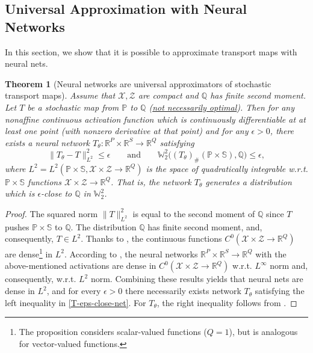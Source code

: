 \documentclass{article} %
\newtheorem{theorem}{Theorem}
\begin{document}
\vspace{-1mm}
\subsection{Universal Approximation with Neural Networks}
\label{sec-universal-approx}
\vspace{-1mm}

In this section, we show that it is possible to approximate transport maps with neural nets.

\begin{theorem}[Neural networks are universal approximators of stochastic transport maps] Assume that $\mathcal{X},\mathcal{Z}$ are compact and $\mathbb{Q}$ has finite second moment. Let $T$ be a stochastic map from $\mathbb{P}$ to $\mathbb{Q}$ (\underline{not necessarily optimal}). Then for any nonaffine continuous activation function which is continuously differentiable at at least one point (with nonzero derivative at that point) and for any $\epsilon>0$, there exists a neural network $T_{\theta}:\mathbb{R}^{P}\times\mathbb{R}^{S}\rightarrow\mathbb{R}^{Q}$ satisfying
\begin{equation}
\|T_{\theta}-T\|^{2}_{L^{2}}\leq \epsilon\qquad\text{and}\qquad \mathbb{W}_{2}^{2}\big((T_{\theta})_{\#}(\mathbb{P}\times\mathbb{S}),\mathbb{Q}\big)\leq \epsilon,
\label{T-eps-close-net}
\end{equation}
where $L^{2}=L^{2}(\mathbb{P}\times\mathbb{S},\mathcal{X}\times\mathcal{Z}\rightarrow\mathbb{R}^{Q})$ is the space of quadratically integrable w.r.t. $\mathbb{P}\times\mathbb{S}$ functions $\mathcal{X}\times\mathcal{Z}\rightarrow\mathbb{R}^{Q}$. That is, the network $T_{\theta}$ generates a distribution which is $\epsilon$-close to $\mathbb{Q}$ in $\mathbb{W}_{2}^{2}$.
\label{thm-universal}
\end{theorem}

\vspace{-3mm}
\begin{proof}
The squared norm $\|T\|_{L^{2}}^{2}$ is equal to the second moment of $\mathbb{Q}$ since $T$ pushes $\mathbb{P}\times\mathbb{S}$ to $\mathbb{Q}$. The distribution $\mathbb{Q}$ has finite second moment, and, consequently, $T\in L^{2}$. Thanks to \citep[Proposition 7.9]{folland1999real}, the continuous functions ${C^{0}(\mathcal{X}\times\mathcal{Z}\rightarrow\mathbb{R}^{Q})}$ are dense\footnote{The proposition considers scalar-valued functions ($Q=1$), but is analogous for vector-valued functions.} in $L^{2}$. According to  \citep[Theorem 3.2]{kidger2020universal}, the neural networks $\mathbb{R}^{P}\times\mathbb{R}^{S}\rightarrow\mathbb{R}^{Q}$ with the above-mentioned activations are dense in ${C^{0}(\mathcal{X}\times\mathcal{Z}\rightarrow\mathbb{R}^{Q})}$ w.r.t. $L^{\infty}$ norm and, consequently, w.r.t. $L^{2}$ norm. Combining these results yields that neural nets are dense in $L^{2}$, and for every $\epsilon>0$ there necessarily exists network $T_{\theta}$ satisfying the left inequality in \eqref{T-eps-close-net}. For $T_{\theta}$, the right inequality follows from \citep[Lemma A.2]{korotin2019wasserstein}.
\end{proof}
\end{document}
